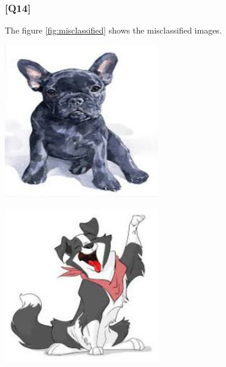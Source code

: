 \documentclass{article}
\begin{document}
\subsubsection*{[Q14]}

The figure \ref{fig:misclassified} shows the misclassified images.

\begin{center}
    \noindent 
    \begin{minipage}{0.142\textwidth}
        \includegraphics[width=\linewidth]{./pic/misclassified_r0_p2_2723.jpg}
    \end{minipage}%
    \begin{minipage}{0.142\textwidth}
        \includegraphics[width=\linewidth]{./pic/misclassified_r0_p3_2723.jpg}

\end{minipage}
\end{center}
\end{document}
